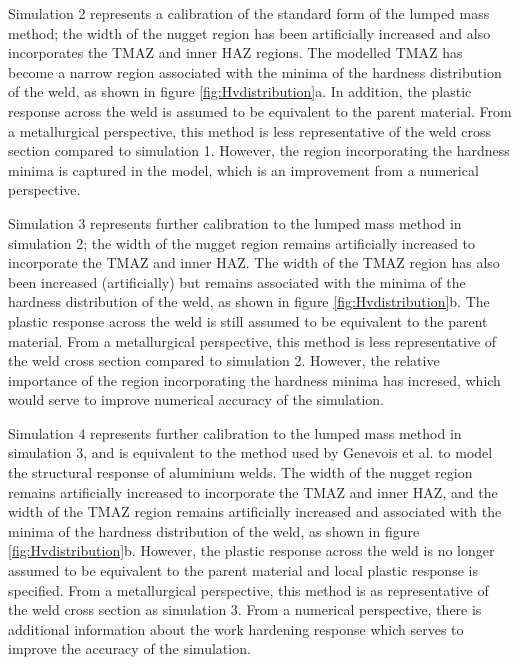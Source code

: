 Simulation 2 represents a calibration of the standard form of the lumped mass method; the width of the nugget region has been artificially increased and also incorporates the TMAZ and inner HAZ regions. The modelled TMAZ has become a narrow region associated with the minima of the hardness distribution of the weld, as shown in figure \ref{fig:Hvdistribution}a. In addition, the plastic response across the weld is assumed to be equivalent to the parent material. From a metallurgical perspective, this method is less representative of the weld cross section compared to simulation 1. However, the region incorporating the hardness minima is captured in the model, which is an improvement from a numerical perspective. 

Simulation 3 represents further calibration to the lumped mass method in simulation 2; the width of the nugget region remains artificially increased to incorporate the TMAZ and inner HAZ. The width of the TMAZ region has also been increased (artificially) but remains associated with the minima of the hardness distribution of the weld, as shown in figure \ref{fig:Hvdistribution}b. The plastic response across the weld is still assumed to be equivalent to the parent material. From a metallurgical perspective, this method is less representative of the weld cross section compared to simulation 2. However, the relative importance of the region incorporating the hardness minima has incresed, which would serve to improve numerical accuracy of the simulation.

Simulation 4 represents further calibration to the lumped mass method in simulation 3, and is equivalent to the method used by Genevois et al. \cite{Genevois2006} to model the structural response of aluminium welds. The width of the nugget region remains artificially increased to incorporate the TMAZ and inner HAZ, and the width of the TMAZ region remains artificially increased and associated with the minima of the hardness distribution of the weld, as shown in figure \ref{fig:Hvdistribution}b. However, the plastic response across the weld is no longer assumed to be equivalent to the parent material and local plastic response is specified. From a metallurgical perspective, this method is as representative of the weld cross section as simulation 3. From a numerical perspective, there is additional information about the work hardening response which serves to improve the accuracy of the simulation.

